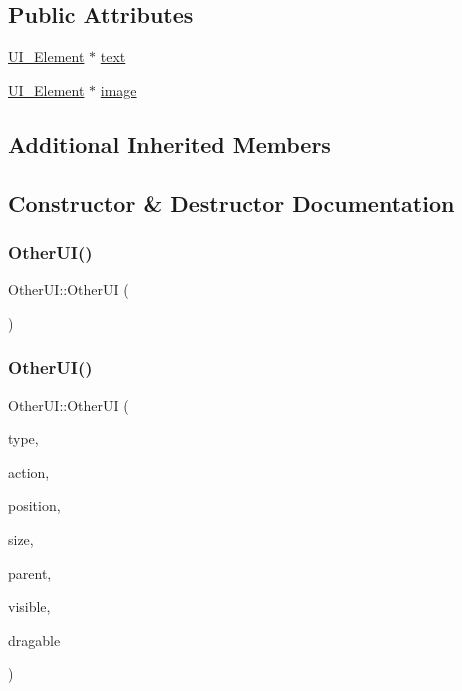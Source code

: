 \subsection*{Public Attributes}
\begin{DoxyCompactItemize}
\item 
\mbox{\hyperlink{class_u_i___element}{U\+I\+\_\+\+Element}} $\ast$ \mbox{\hyperlink{class_other_u_i_ac67a55f5ad3206125c93d7f76adce12c}{text}}
\item 
\mbox{\hyperlink{class_u_i___element}{U\+I\+\_\+\+Element}} $\ast$ \mbox{\hyperlink{class_other_u_i_a4e2319e8bc9ece97aa0a041c01b7e666}{image}}
\end{DoxyCompactItemize}
\subsection*{Additional Inherited Members}


\subsection{Constructor \& Destructor Documentation}
\mbox{\label{class_other_u_i_a578f422a850cb0bc5823b80b7e56f3f0}} 
\subsubsection{\texorpdfstring{OtherUI()}{OtherUI()}\hspace{0.1cm}{\footnotesize\ttfamily [1/2]}}
{\footnotesize\ttfamily Other\+U\+I\+::\+Other\+UI (\begin{DoxyParamCaption}{ }\end{DoxyParamCaption})}

\mbox{\label{class_other_u_i_a4d919422d92870f71616b2ca50b0ed84}} 
\subsubsection{\texorpdfstring{OtherUI()}{OtherUI()}\hspace{0.1cm}{\footnotesize\ttfamily [2/2]}}
{\footnotesize\ttfamily Other\+U\+I\+::\+Other\+UI (\begin{DoxyParamCaption}\item[{\mbox{\hyperlink{class_u_i___element_a7ed595c46c75d53d30fa3813b036cf1e}{U\+I\+\_\+type}}}]{type,  }\item[{\mbox{\hyperlink{class_u_i___element_ae179047d98a379f4e0dcdf0871c7b8d6}{Action}}}]{action,  }\item[{pair$<$ int, int $>$}]{position,  }\item[{pair$<$ int, int $>$}]{size,  }\item[{\mbox{\hyperlink{class_u_i___element}{U\+I\+\_\+\+Element}} $\ast$}]{parent,  }\item[{bool}]{visible,  }\item[{\mbox{\hyperlink{struct_dragable}{Dragable}}}]{dragable }\end{DoxyParamCaption})}

